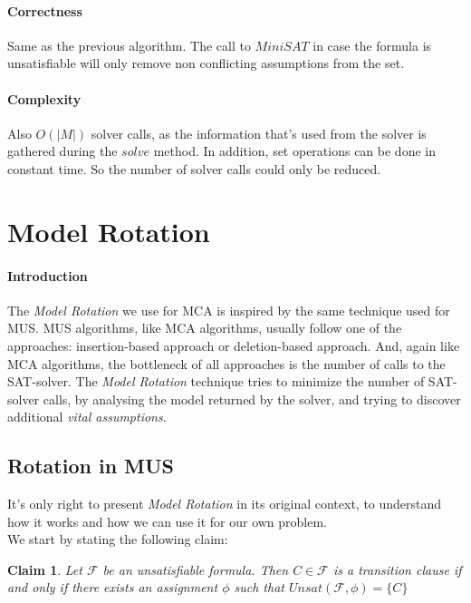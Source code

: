 \documentclass[]{article}
\newtheorem{claim}  {Claim}
\newcommand{\msat}[0]{$MiniSAT$ }
\begin{document}
		\paragraph{Correctness} Same as the previous algorithm. The call to \msat in case the formula is unsatisfiable will only remove non conflicting assumptions from the set.
		
		\paragraph{Complexity} Also $ O \left( | M |\right) $ solver calls, as the information that's used from the solver is gathered during the $ solve $ method. In addition, set operations can be done in constant time. So the number of solver calls could only be reduced.
		
	\pagebreak
	\section{Model Rotation}
	\paragraph{Introduction} The \textit{Model Rotation} we use for MCA is inspired by the same technique used for MUS. MUS algorithms, like MCA algorithms, usually follow one of the approaches: insertion-based approach or deletion-based approach. And, again like MCA algorithms, the bottleneck of all approaches is the number of calls to the SAT-solver\cite{Rotation}. The \textit{Model Rotation} technique tries to minimize the number of SAT-solver calls, by analysing the model returned by the solver, and trying to discover additional \textit{vital assumptions}.
		
	\subsection{Rotation in MUS}
	It's only right to present \textit{Model Rotation} in its original context, to understand how it works and how we can use it for our own problem.\\
	We start by stating the following claim:
	\begin{claim}
		Let $ \mathcal{F} $ be an unsatisfiable formula. Then $ C \in \mathcal{F} $ is a transition clause if and only if there exists an assignment $ \phi $ such that $ Unsat(\mathcal{F}, \phi) = \{C\} $
	\end{claim}
	
\end{document}
